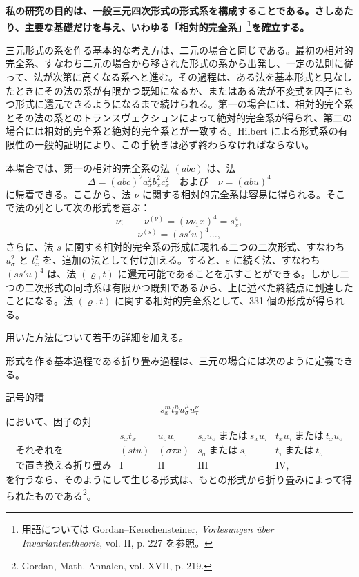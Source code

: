 \documentclass[11pt]{jlreq}
\begin{document}
\textbf{私の研究の目的は、一般三元四次形式の形式系を構成することである。さしあたり、主要な基礎だけを与え、いわゆる「相対的完全系」\footnote{用語については Gordan--Kerschensteiner, \emph{Vorlesungen über Invariantentheorie}, vol. II, p. 227 を参照。}を確立する。}

三元形式の系を作る基本的な考え方は、二元の場合と同じである。最初の相対的完全系、すなわち二元の場合から移された形式の系から出発し、一定の法則に従って、法が次第に高くなる系へと進む。その過程は、ある法を基本形式と見なしたときにその法の系が有限かつ既知になるか、またはある法が不変式を因子にもつ形式に還元できるようになるまで続けられる。第一の場合には、相対的完全系とその法の系とのトランスヴェクションによって絶対的完全系が得られ、第二の場合には相対的完全系と絶対的完全系とが一致する。Hilbert による形式系の有限性の一般的証明により、この手続きは必ず終わらなければならない。

本場合では、第一の相対的完全系の法 \((abc)\) は、法
\[
\Delta=(abc)^2a_x^2b_x^2c_x^2\quad\text{および}\quad \nu=(abu)^4
\]
に帰着できる。ここから、法 \(\nu\) に関する相対的完全系は容易に得られる。そこで法の列として次の形式を選ぶ：
\[
\nu;\qquad \nu^{(\nu)}=(\nu\nu_1x)^4=s_x^4,
\]
\[
\nu^{(s)}=(ss'u)^4\ldots,
\]
さらに、法 \(s\) に関する相対的完全系の形成に現れる二つの二次形式、すなわち \(u_\sigma^2\) と \(t_x^2\) を、追加の法として付け加える。すると、\(s\) に続く法、すなわち \((ss'u)^4\) は、法 \((\varrho,t)\) に還元可能であることを示すことができる。しかし二つの二次形式の同時系は有限かつ既知であるから、上に述べた終結点に到達したことになる。法 \((\varrho,t)\) に関する相対的完全系として、331 個の形成が得られる。

用いた方法について若干の詳細を加える。

形式を作る基本過程である折り畳み過程は、三元の場合には次のように定義できる。

記号的積
\[
s_x^m t_x^n u_\sigma^\mu u_\tau^\nu
\]
において、因子の対
\[
\begin{array}{c|c|c|c|c}
 & s_xt_x & u_\sigma u_\tau & s_xu_\sigma\ \text{または}\ s_xu_\tau & t_xu_\tau\ \text{または}\ t_xu_\sigma\\
\text{それぞれを} & (stu) & (\sigma\tau x) & s_\sigma\ \text{または}\ s_\tau & t_\tau\ \text{または}\ t_\sigma\\
\text{で置き換える折り畳み} & \mathrm{I} & \mathrm{II} & \mathrm{III} & \mathrm{IV},
\end{array}
\]
を行うなら、そのようにして生じる形式は、もとの形式から折り畳みによって得られたものである\footnote{Gordan, Math. Annalen, vol. XVII, p. 219.}。
\end{document}
